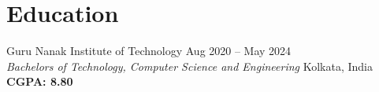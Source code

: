 \section{Education}
{Guru Nanak Institute of Technology \hfill Aug 2020 -- May 2024} \\
\textit{Bachelors of Technology, Computer Science and Engineering} \hfill Kolkata, India \\
\textbf{CGPA: 8.80}
